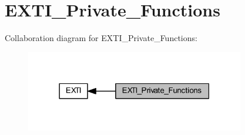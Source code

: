 \hypertarget{group___e_x_t_i___private___functions}{}\section{E\+X\+T\+I\+\_\+\+Private\+\_\+\+Functions}
\label{group___e_x_t_i___private___functions}
Collaboration diagram for E\+X\+T\+I\+\_\+\+Private\+\_\+\+Functions\+:
\nopagebreak
\begin{figure}[H]
\begin{center}
\leavevmode
\includegraphics[width=271pt]{group___e_x_t_i___private___functions}
\end{center}
\end{figure}
